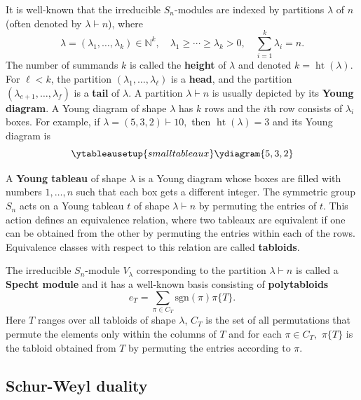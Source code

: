 \documentclass[12pt,dvipsnames,accepted=2016-08-18,a4paper,onecolumn]{quantumarticle}
\DeclareMathOperator{\het}{ht}
\numberwithin{equation}{section}
\newcommand{\N}{\mathbb N}
\theoremstyle{definition}
\begin{document}
 It is well-known that the irreducible $S_n$-modules are indexed by partitions $\lambda$ of $n$ (often denoted by $\lambda \vdash n$), where
 $$
 \lambda = (\lambda_1, \ldots, \lambda_k)\in\N^k, \quad \lambda_1 \geq \cdots \geq \lambda_k > 0, 
 \quad \sum_{i=1}^k \lambda_i = n.
 $$
The number of summands $k$ is called the \textbf{height} of $\lambda$ and denoted $k=\het(\lambda)$. For $\ell<k$, the partition $(\lambda_1,\ldots,\lambda_\ell)$ is a \textbf{head}, and the partition $(\lambda_{e+1},\ldots,\lambda_f)$ is a \textbf{tail} of $\lambda$. 
A partition $\lambda \vdash n$ is usually depicted by its \textbf{Young diagram}. A Young diagram of shape $\lambda$ has $k$ rows and the $i$th row consists of $\lambda_i$ boxes. For example, if $\lambda= (5,3,2) \vdash 10,$ then $\het(\lambda)=3$ and its Young diagram is
\[
\ytableausetup{smalltableaux}
\ydiagram{5,3,2}
\]

\vspace{2mm}

A \textbf{Young tableau} of shape $\lambda$ is a Young diagram whose boxes are filled with numbers $1,\ldots,n$ such that each box gets a different integer.
The symmetric group $S_n$ acts on a Young tableau $t$ of shape $\lambda \vdash n$ by permuting the entries of $t.$ This action defines an equivalence relation, where two tableaux are equivalent if one can be obtained from the other by permuting the entries within each of the rows.
Equivalence classes with respect to this relation are called \textbf{tabloids}.


The irreducible $S_n$-module $V_\lambda$ corresponding to the partition $\lambda \vdash n$ is called a \textbf{Specht module} and it has a well-known basis consisting of  \textbf{polytabloids} 
	$$
	e_T = \sum_{\pi \in C_T} \text{sgn}(\pi) \pi\{T\}.
	$$ 
	Here $T$ ranges over all tabloids of shape $\lambda$, $C_T$ is the set of all permutations that permute the elements only within the columns of $T$ and for each $\pi \in C_T,$  $\pi\{T\}$ is the tabloid obtained from $T$ by permuting the entries according to $\pi.$ 




\subsection{Schur-Weyl duality}\label{ssec:sw}
\end{document}
